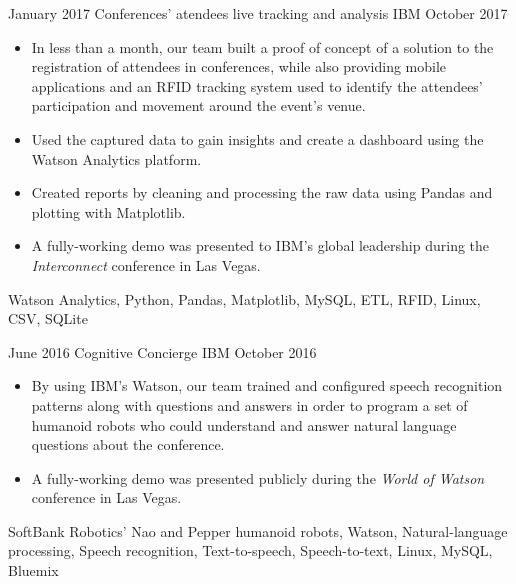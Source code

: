 %
%
%


\begin{projects}

    \project
        {January 2017}
        {Conferences' atendees live tracking and analysis}
        {IBM}
        {October 2017}
        {
            \begin{itemize}
                \item In less than a month, our team built a proof of concept 
                    of a solution to the registration of attendees in 
                    conferences, while also providing mobile applications and 
                    an RFID tracking system used to identify the attendees' 
                    participation and movement around the event's venue.
                \item Used the captured data to gain insights and create a 
                    dashboard using the Watson Analytics platform.
                \item Created reports by cleaning and processing the raw data 
                    using Pandas and plotting with Matplotlib.
                \item A fully-working demo was presented to IBM's global 
                    leadership during the \textit{Interconnect} conference in 
                    Las Vegas.
            \end{itemize}
        }
        {
            Watson Analytics,
            Python,
            Pandas,
            Matplotlib,
            MySQL,
            ETL,
            RFID, 
            Linux,
            CSV,
            SQLite
        }

    \emptySeparator

    \project
        {June 2016}
        {Cognitive Concierge}
        {IBM}
        {October 2016}
        {
            \begin{itemize}
                \item By using IBM's Watson, our team trained and configured 
                    speech recognition patterns along with questions and 
                    answers in order to program a set of humanoid robots who 
                    could understand and answer natural language questions 
                    about the conference.
                \item A fully-working demo was presented publicly during the 
                    \textit{World of Watson} conference in Las Vegas.
            \end{itemize}
        }
        {
            SoftBank Robotics' Nao and Pepper humanoid robots,
            Watson,
            Natural-language processing,
            Speech recognition,
            Text-to-speech,
            Speech-to-text,
            Linux,
            MySQL,
            Bluemix
        }


\end{projects}
